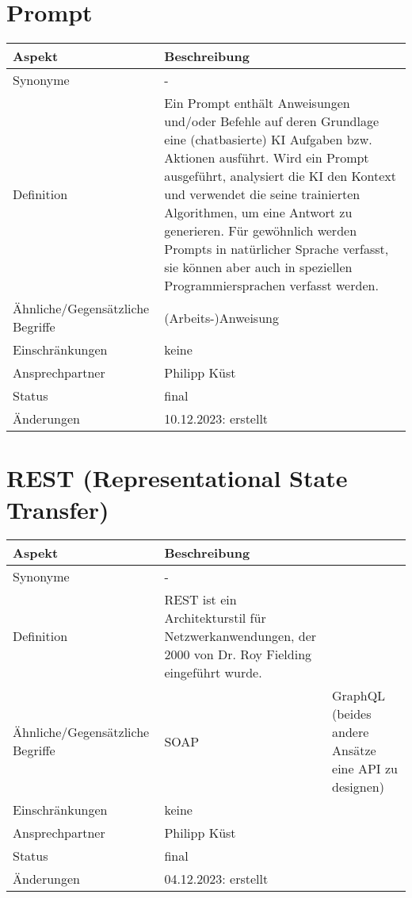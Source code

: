 \section{Prompt}\label{sec:glossar_prompt}
\begin{tabularx}{\textwidth}{|l|X|}
    \hline
    \textbf{Aspekt} & \textbf{Beschreibung} \\
    \hline
    Synonyme & - \\
    \hline
    Definition & Ein Prompt enthält Anweisungen und/oder Befehle auf deren Grundlage eine (chatbasierte) KI Aufgaben bzw. Aktionen ausführt.
    Wird ein Prompt ausgeführt, analysiert die KI den Kontext und verwendet die seine trainierten Algorithmen, um eine Antwort zu generieren.
    Für gewöhnlich werden Prompts in natürlicher Sprache verfasst, sie können aber auch in speziellen Programmiersprachen verfasst werden.\\
    \hline
    Ähnliche/Gegensätzliche Begriffe & (Arbeits-)Anweisung \\
    \hline
    Einschränkungen & keine\\
    \hline
    Ansprechpartner & Philipp Küst \\
    \hline
    Status & final \\
    \hline
    Änderungen & 10.12.2023: erstellt \\
    \hline
\end{tabularx}

\section{REST (Representational State Transfer)}\label{sec:glossar_rest}
\begin{tabularx}{\textwidth}{|l|X|}
    \hline
    \textbf{Aspekt} & \textbf{Beschreibung} \\
    \hline
    Synonyme & - \\
    \hline
    Definition & REST ist ein Architekturstil für Netzwerkanwendungen, der 2000 von Dr. Roy Fielding eingeführt wurde. \\
    \hline
    Ähnliche/Gegensätzliche Begriffe & SOAP & GraphQL (beides andere Ansätze eine API zu designen) \\
    \hline
    Einschränkungen & keine \\
    \hline
    Ansprechpartner & Philipp Küst \\
    \hline
    Status & final \\
    \hline
    Änderungen & 04.12.2023: erstellt \\
    \hline
\end{tabularx}

